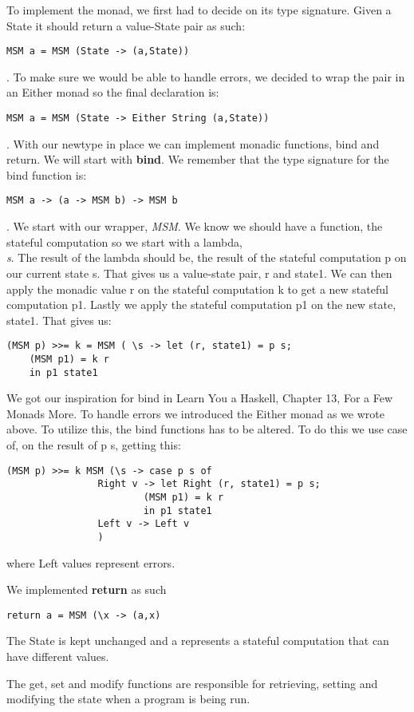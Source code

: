 \documentclass[]{article}
\begin{document}
To implement the monad, we first had to decide on its type signature. Given a State it should return a value-State pair as such: \begin{verbatim}MSM a = MSM (State -> (a,State))\end{verbatim}. To make sure we would be able to handle errors, we decided to wrap the pair in an Either monad so the final declaration is: \begin{verbatim}MSM a = MSM (State -> Either String (a,State))\end{verbatim}.
With our newtype in place we can implement monadic functions, bind and return. 
We will start with \textbf{bind}. We remember that the type signature for the bind function is: 
\begin{verbatim}MSM a -> (a -> MSM b) -> MSM b\end{verbatim}. We start with our wrapper, \emph{MSM}. We know we should have a function, the stateful computation so we start with a lambda, \emph{\\s}. The result of the lambda should be, the result of the stateful computation p on our current state s. That gives us a value-state pair, r and state1. We can then apply the monadic value r on the stateful computation k to get a new stateful computation p1. Lastly we apply the stateful computation p1 on the new state, state1. That gives us: 
\begin{verbatim}(MSM p) >>= k = MSM ( \s -> let (r, state1) = p s;
	(MSM p1) = k r
	in p1 state1
\end{verbatim}
We got our inspiration for bind in Learn You a Haskell, Chapter 13, For a Few Monads More.
To handle errors we introduced the Either monad as we wrote above. To utilize this, the bind functions has to be altered. To do this we use case of, on the result of p s,  getting this:
\begin{verbatim}
(MSM p) >>= k MSM (\s -> case p s of
				Right v -> let Right (r, state1) = p s;
						(MSM p1) = k r
						in p1 state1
				Left v -> Left v
				)
\end{verbatim}
where Left values represent errors.\par
We implemented \textbf{return} as such \begin{verbatim}return a = MSM (\x -> (a,x)\end{verbatim} The State is kept unchanged and a represents a stateful computation that can have different values. \par
The get, set and modify functions are responsible for retrieving, setting and modifying the state when a program is being run.\par
\end{document}
